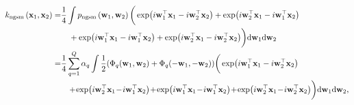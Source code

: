 \begin{equation}
\begin{aligned}
k_{\text{ngsm}}\left(\x_1, \x_2\right) = &\frac{1}{4} \int p_{\text{ngsm}} \left(\mathbf{w}_1, \mathbf{w}_2\right) \bigg(
\exp(i\w_1^{\top} \x_1 - i\w_2^{\top} \x_2) + \exp(i\w_2^{\top} \x_1 - i\w_1^{\top} \x_2) \nonumber \\
&\quad + \exp(i\w_1^{\top} \x_1 - i\w_1^{\top} \x_2) + \exp(i\w_2^{\top} \x_1 - i\w_2^{\top} \x_2) \bigg)
\mathrm{d}\w_1 \mathrm{d}\w_2 \\
= &\frac{1}{4} \sum_{q=1}^Q \alpha_q \int \frac{1}{2}(\Phi_q(\w_1,\w_2) + \Phi_q(-\w_1,-\w_2)) \bigg(
\exp(i\w_1^{\top} \x_1 - i\w_2^{\top} \x_2)  \nonumber\\
&\quad \!+\! \exp(i\w_2^{\top} \x_1 \!-\! i\w_1^{\top} \x_2) \!+\! \exp(i\w_1^{\top} \x_1 \!-\! i\w_1^{\top} \x_2) \!+\! \exp(i\w_2^{\top} \x_1 \!-\! i\w_2^{\top} \x_2) \bigg)
\mathrm{d}\w_1 \mathrm{d}\w_2,
\end{aligned}
\end{equation}
